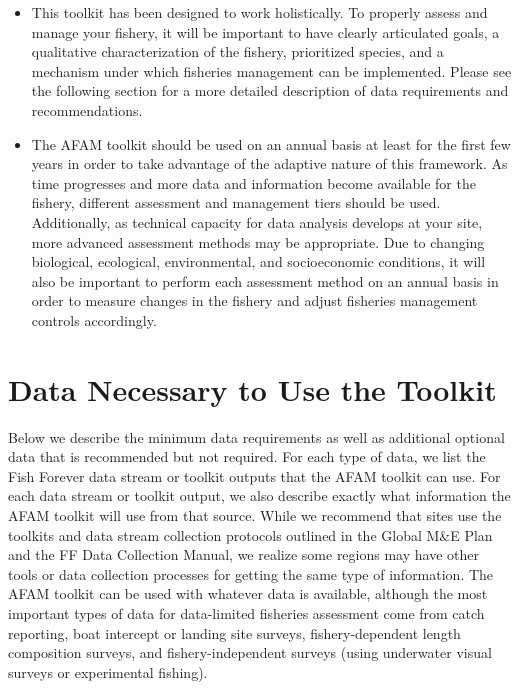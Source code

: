 \documentclass[]{book}
\begin{document}
\begin{itemize}
\item
  This toolkit has been designed to work holistically. To properly
  assess and manage your fishery, it will be important to have clearly
  articulated goals, a qualitative characterization of the fishery,
  prioritized species, and a mechanism under which fisheries management
  can be implemented. Please see the following section for a more
  detailed description of data requirements and recommendations.
\item
  The AFAM toolkit should be used on an annual basis at least for the
  first few years in order to take advantage of the adaptive nature of
  this framework. As time progresses and more data and information
  become available for the fishery, different assessment and management
  tiers should be used. Additionally, as technical capacity for data
  analysis develops at your site, more advanced assessment methods may
  be appropriate. Due to changing biological, ecological, environmental,
  and socioeconomic conditions, it will also be important to perform
  each assessment method on an annual basis in order to measure changes
  in the fishery and adjust fisheries management controls accordingly.
\end{itemize}

\section{Data Necessary to Use the
Toolkit}\label{data-necessary-to-use-the-toolkit}

Below we describe the minimum data requirements as well as additional
optional data that is recommended but not required. For each type of
data, we list the Fish Forever data stream or toolkit outputs that the
AFAM toolkit can use. For each data stream or toolkit output, we also
describe exactly what information the AFAM toolkit will use from that
source. While we recommend that sites use the toolkits and data stream
collection protocols outlined in the Global M\&E Plan and the FF Data
Collection Manual, we realize some regions may have other tools or data
collection processes for getting the same type of information. The AFAM
toolkit can be used with whatever data is available, although the most
important types of data for data-limited fisheries assessment come from
catch reporting, boat intercept or landing site surveys,
fishery-dependent length composition surveys, and fishery-independent
surveys (using underwater visual surveys or experimental fishing).
\end{document}
